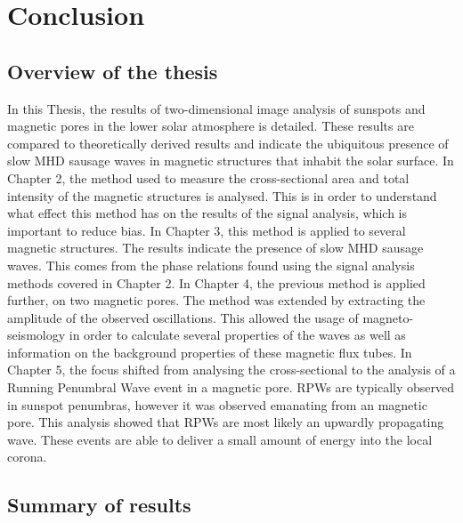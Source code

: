 \graphicspath{{Chapter6/Figs/}}

\chapter{Conclusion}
\label{chapter6}
    
    \vspace*{\fill}\par
    \pagebreak

\section{Overview of the thesis}
    
	In this Thesis, the results of two-dimensional image analysis of sunspots and magnetic pores in the lower solar atmosphere is detailed.
    These results are compared to theoretically derived results and indicate the ubiquitous presence of slow MHD sausage waves in magnetic structures that inhabit the solar surface.
    In Chapter 2, the method used to measure the cross-sectional area and total intensity of the magnetic structures is analysed.
    This is in order to understand what effect this method has on the results of the signal analysis, which is important to reduce bias.
    In Chapter 3, this method is applied to several magnetic structures.
    The results indicate the presence of slow MHD sausage waves.
    This comes from the phase relations found using the signal analysis methods covered in Chapter 2.
    In Chapter 4, the previous method is applied further, on two magnetic pores.
    The method was extended by extracting the amplitude of the observed oscillations.
    This allowed the usage of magneto-seismology in order to calculate several properties of the waves as well as information on the background properties of these magnetic flux tubes.
    In Chapter 5, the focus shifted from analysing the cross-sectional to the analysis of a Running Penumbral Wave event in a magnetic pore.
    RPWs are typically observed in sunspot penumbras, however it was observed emanating from an magnetic pore.
    This analysis showed that RPWs are most likely an upwardly propagating wave.
    These events are able to deliver a small amount of energy into the local corona.
       
\section{Summary of results}
    
